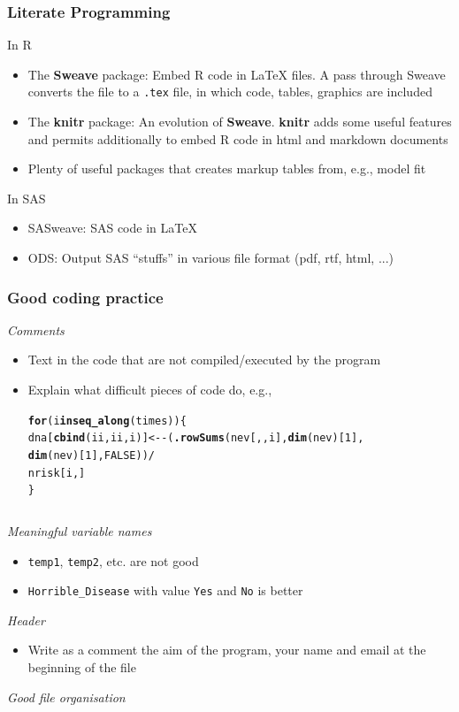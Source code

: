 \documentclass[paper=screen,mathserif]{beamer}\usepackage[]{graphicx}\usepackage[]{color}
\makeatletter
\newcommand{\hlnum}[1]{\textcolor[rgb]{0.686,0.059,0.569}{#1}}%
\newcommand{\hlopt}[1]{\textcolor[rgb]{0,0,0}{#1}}%
\newcommand{\hlstd}[1]{\textcolor[rgb]{0.345,0.345,0.345}{#1}}%
\newcommand{\hlkwa}[1]{\textcolor[rgb]{0.161,0.373,0.58}{\textbf{#1}}}%
\newcommand{\hlkwb}[1]{\textcolor[rgb]{0.69,0.353,0.396}{#1}}%
\newcommand{\hlkwd}[1]{\textcolor[rgb]{0.737,0.353,0.396}{\textbf{#1}}}%
\newenvironment{kframe}{%
 \def\at@end@of@kframe{}%
 \ifinner\ifhmode%
  \def\at@end@of@kframe{\end{minipage}}%
  \begin{minipage}{\columnwidth}%
 \fi\fi%
 \def\FrameCommand##1{\hskip\@totalleftmargin \hskip-\fboxsep
 \colorbox{shadecolor}{##1}\hskip-\fboxsep
     \hskip-\linewidth \hskip-\@totalleftmargin \hskip\columnwidth}%
 \MakeFramed {\advance\hsize-\width
   \@totalleftmargin\z@ \linewidth\hsize
   \@setminipage}}%
 {\par\unskip\endMakeFramed%
 \at@end@of@kframe}
\newenvironment{knitrout}{}{} %
\makeatother
\begin{document}
\begin{frame}
  \frametitle{Literate Programming}
  In R
  \begin{itemize}
  \item The {\bf Sweave} package: Embed R code in \LaTeX{} files. A
    pass through Sweave converts the file to a {\tt .tex} file, in which
    code, tables, graphics are included 
  \item The {\bf knitr} package: An evolution of {\bf Sweave}. {\bf
      knitr} adds some useful features and permits additionally to
    embed R code in html and markdown documents
  \item Plenty of useful packages that creates markup tables from,
    e.g., model fit
  \end{itemize}
  In SAS
  \begin{itemize}
  \item SASweave: SAS code in \LaTeX
  \item ODS: Output SAS ``stuffs'' in various file format (pdf, rtf,
    html, ...)
  \end{itemize}
\end{frame}

\begin{frame}[fragile]
  \frametitle{Good coding practice}
  {\em Comments}
  \begin{itemize}
  \item Text in the code that are not compiled/executed by the program
  \item Explain what difficult pieces of code do, e.g.,
\begin{knitrout}\scriptsize
{}\color{fgcolor}\begin{kframe}
\begin{alltt}
\hlkwa{for} \hlstd{(i} \hlkwa{in} \hlkwd{seq_along}\hlstd{(times)) \{}
    \hlstd{dna[}\hlkwd{cbind}\hlstd{(ii, ii, i)]} \hlkwb{<-} \hlopt{-}\hlstd{(}\hlkwd{.rowSums}\hlstd{(nev[, , i],} \hlkwd{dim}\hlstd{(nev)[}\hlnum{1}\hlstd{],}
                                        \hlkwd{dim}\hlstd{(nev)[}\hlnum{1}\hlstd{],} \hlnum{FALSE}\hlstd{))} \hlopt{/}
        \hlstd{nrisk[i, ]}
\hlstd{\}}
\end{alltt}
\end{kframe}
\end{knitrout}

{\scriptsize
\begin{verbatim}
\end{verbatim}}
  \end{itemize}
  {\em Meaningful variable names}
  \begin{itemize}
  \item {\tt temp1}, {\tt temp2}, etc. are not good
  \item {\tt Horrible\_Disease} with value {\tt Yes} and {\tt No} is
    better
  \end{itemize}
{\em Header}
\begin{itemize}
\item Write as a comment the aim of the program, your name and email
  at the beginning of the file 
\end{itemize}
{\em Good file organisation} 
\end{frame}
\end{document}
